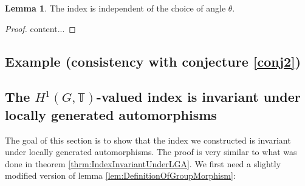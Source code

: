 \documentclass[12pt,a4paper,twoside]{article}
\newcommand{\TT}{\mathbb T}
\theoremstyle{definition}
\newtheorem{lemma}[theorem]{Lemma}
\numberwithin{equation}{section}
\begin{document}
\begin{lemma}
	The index is independent of the choice of angle $\theta$.
\end{lemma}
\begin{proof}
	content...
\end{proof}
\subsection{Example (consistency with conjecture \ref{conj2})}
\subsection{The $H^1(G,\TT)$-valued index is invariant under locally generated automorphisms}
The goal of this section is to show that the index we constructed is invariant under locally generated automorphisms. The proof is very similar to what was done in theorem \ref{thrm:IndexInvariantUnderLGA}. We first need a slightly modified version of lemma \ref{lem:DefinitionOfGroupMorphism}:
\end{document}
